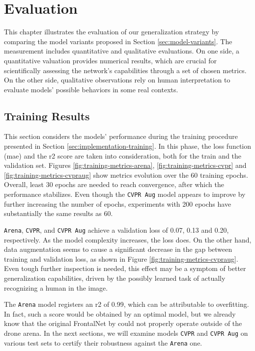 \chapter{Evaluation}
\label{chap:evaluation}


This chapter illustrates the evaluation of our generalization strategy by comparing the model variants proposed in Section \ref{sec:model-variants}. The measurement includes quantitative and qualitative evaluations. On one side, a quantitative valuation provides numerical results, which are crucial for scientifically assessing the network's capabilities through a set of chosen metrics. On the other side, qualitative observations rely on human interpretation to evaluate models' possible behaviors in some real contexts.



\section{Training Results}
\label{sec:evaluation-training}

This section considers the models' performance during the training procedure presented in Section \ref{sec:implementation-training}. In this phase, the loss function (\gls{mae}) and the \gls{r2} score are taken into consideration, both for the train and the validation set. Figures \ref{fig:training-metrics-arena}, \ref{fig:training-metrics-cvpr} and \ref{fig:training-metrics-cvpraug} show metrics evolution over the 60 training epochs. Overall, least 30 epochs are needed to reach convergence, after which the performance stabilizes. Even though the \texttt{CVPR Aug} model appears to improve by further increasing the number of epochs, experiments with 200 epochs have substantially the same results as 60.

\texttt{Arena}, \texttt{CVPR}, and \texttt{CVPR Aug} achieve a validation loss of 0.07, 0.13 and 0.20, respectively. As the model complexity increases, the loss does. On the other hand, data augmentation seems to cause a significant decrease in the gap between training and validation loss, as shown in Figure \ref{fig:training-metrics-cvpraug}. Even tough further inspection is needed, this effect may be a symptom of better generalization capabilities, driven by the possibly learned task of actually recognizing a human in the image. 

The \texttt{Arena} model registers an \gls{r2} of 0.99, which can be attributable to overfitting. In fact, such a score would be obtained by an optimal model, but we already know that the original FrontalNet by \cite{mantegazza2019visionbased} could not properly operate outside of the drone arena. In the next sections, we will examine models \texttt{CVPR} and \texttt{CVPR Aug} on various test sets to certify their robustness against the \texttt{Arena} one.

